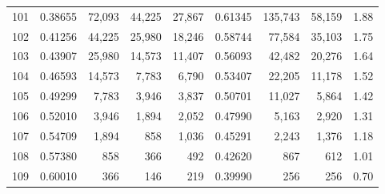 \begin{longtable}{rrrrrrrrr}
101 & 0.38655 & 72,093 & 44,225 & 27,867 & 0.61345 & 135,743 & 58,159 & 1.88 \\
102 & 0.41256 & 44,225 & 25,980 & 18,246 & 0.58744 & 77,584 & 35,103 & 1.75 \\
103 & 0.43907 & 25,980 & 14,573 & 11,407 & 0.56093 & 42,482 & 20,276 & 1.64 \\
104 & 0.46593 & 14,573 & 7,783 & 6,790 & 0.53407 & 22,205 & 11,178 & 1.52 \\
105 & 0.49299 & 7,783 & 3,946 & 3,837 & 0.50701 & 11,027 & 5,864 & 1.42 \\
106 & 0.52010 & 3,946 & 1,894 & 2,052 & 0.47990 & 5,163 & 2,920 & 1.31 \\
107 & 0.54709 & 1,894 & 858 & 1,036 & 0.45291 & 2,243 & 1,376 & 1.18 \\
108 & 0.57380 & 858 & 366 & 492 & 0.42620 & 867 & 612 & 1.01 \\
109 & 0.60010 & 366 & 146 & 219 & 0.39990 & 256 & 256 & 0.70 \\
\end{longtable}
